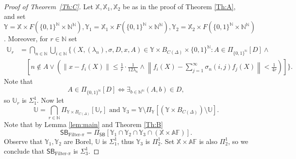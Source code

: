 \documentclass[12pt,fleqn]{amsart}
\newcommand{\IN}{\mathbb{N}}
\renewcommand{\leq}{\leqslant}
\theoremstyle{definition}
\theoremstyle{remark}
\begin{document}
\begin{proof}[Proof of Theorem~\ref{Th:C}]
Let $\mathbb{X}, \mathbb{X}_1, \mathbb{X}_2$ be as in the proof of Theorem \ref{Th:A}, and set 
$    \mathbb{Y}=\mathbb{X}\times F\left(\{0,1\}^\IN\times\IN^\IN\right), \mathbb{Y}_1=\mathbb{X}_1\times F\left(\{0,1\}^\IN\times\IN^\IN\right), \mathbb{Y}_2=\mathbb{X}_2\times F\left(\{0,1\}^\IN\times\IN^\IN\right)$.
Moreover, for $r\in\IN$ set
        \begin{align*}
\mathbb{U}_{r}
&= 
    \bigcap_{n\in\IN}
     \bigcup_{i \in \mathbb{N}} 
    \Bigg\{ (X, (\lambda_n), \sigma, D, x,  A)\in \mathbb{Y}\times B_{C(\Delta)}\times \{0,1\}^\IN  \colon A \in \Pi_{\{0,1\}^\IN}[D] \wedge 
\\
&\quad \left[ n\notin A \vee \left(
\| x-f_i(X)\| \leq \frac1r\cdot\frac{1}{12\lambda_n} \wedge \left\|f_i(X) - \sum_{j=1}^\infty \sigma_{n}(i,j) f_j(X)\right\| < \frac{1}{4r} \right)\right]
  \Bigg\}.
\end{align*}
Note that 
\[
A \in \Pi_{\{0,1\}^\IN}[D] \Leftrightarrow \exists_{b\in\IN^\IN} (A,b)\in D,
\]
so $\mathbb{U}_{r}$ is $\Sigma_1^1$.
Now let
\[
\mathbb{U}=\bigcap_{r\in\IN}  \Pi_{\mathbb{Y}\times B_{C(\Delta)}} [\mathbb{U}_r] \mbox{ and } \mathbb{Y}_3 = \mathbb{Y} \setminus \Pi_{\mathbb{Y}}\left[\left( \mathbb{Y} \times B_{C(\Delta)}\right)\setminus \mathbb{U}\right].
\]
Note that by Lemma \ref{lem:main} and Theorem \ref{Th:B} 
\[
\mathsf{SB}_{\text{Filter-}\pi}=\Pi_{\mathsf{SB}}\left[\mathbb{Y}_{1}\cap \mathbb{Y}_{2} \cap \mathbb{Y}_{3}\cap\left(\mathbb{X}\times\mathbb{AF}\right)\right].
\]
Observe that $\mathbb{Y}_{1},\mathbb{Y}_{2}$ are Borel, $\mathbb{U}$ is $\Sigma_1^1$, thus $\mathbb{Y}_3$ is $\Pi^1_{2}$. Set $\mathbb{X}\times\mathbb{AF}$ is also $\Pi^1_2$, so we conclude that $\mathsf{SB}_{\text{Filter-}\pi}$ is $\Sigma_{3}^1$.
\end{proof}
\end{document}
